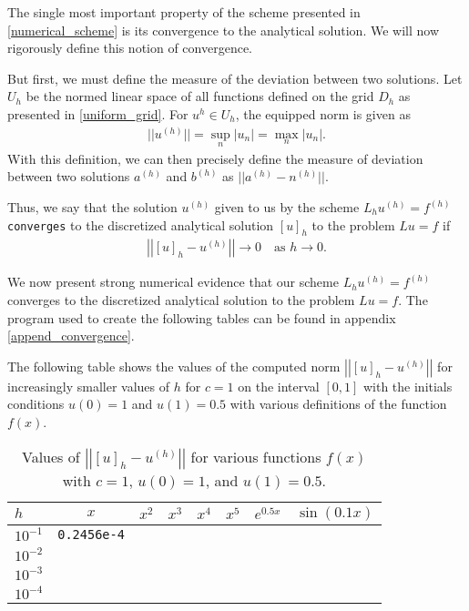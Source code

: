 The single most important property of the scheme presented in
\eqref{numerical_scheme} is its convergence to the analytical solution. We will
now rigorously define this notion of convergence.

But first, we must define the measure of the deviation between two solutions.
Let $U_h$ be the normed linear space of all functions defined on the grid $D_h$
as presented in \eqref{uniform_grid}. For $u^{h} \in U_h$, the equipped norm is
given as
\begin{align}\label{norm}
  ||u^{(h)}|| = \sup_n |u_n| = \max_n |u_n|.
\end{align}
With this definition, we can then precisely define the measure of deviation
between two solutions $a^{(h)}$ and $b^{(h)}$ as $||a^{(h)} - n^{(h)}||$.

Thus, we say that the solution $u^{(h)}$ given to us by the
scheme $L_h u^{(h)} = f^{(h)}$ \texttt{converges} to the discretized analytical
solution $[u]_h$ to the problem $Lu = f$ if
\begin{align}\label{convergence_def}
  \left|\left|[u]_h - u^{(h)}\right|\right| \to 0 \quad \text{as $h \to 0$}.
\end{align}

We now present strong numerical evidence that our scheme $L_h u^{(h)} = f^{(h)}$
converges to the discretized analytical solution to the problem $Lu = f$. The
program used to create the following tables can be found in appendix \ref{append_convergence}.

The following table shows the values of the computed norm $\left|\left|[u]_h - u^{(h)}\right|\right|$ for
increasingly smaller values of $h$ for $c=1$ on the interval $[0, 1]$ with the
initials conditions $u(0) = 1$ and $u(1) = 0.5$ with various definitions of
the function $f(x)$.

\begin{table}[h!]
  \centering
  \bgroup
  \def\arraystretch{1.5}
  \begin{tabular}{| l | c | c | c | c | c | c | c |}
    \hline
    $h$ & $x$ & $x^2$ & $x^3$ & $x^4$ & $x^5$ & $e^{0.5x}$ & $\sin(0.1 x)$\\
    \hline
    $10^{-1}$ & \texttt{0.2456e-4} & & & & & & \\
    $10^{-2}$ & & & & & & & \\
    $10^{-3}$ & & & & & & & \\
    $10^{-4}$ & & & & & & & \\
    \hline
  \end{tabular}
  \egroup
  \caption{Values of $\left|\left|[u]_h - u^{(h)}\right|\right|$ for various functions $f(x)$ with $c = 1$, $u(0) = 1$, and $u(1) = 0.5$.}
\end{table}

